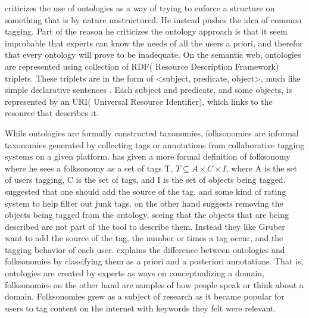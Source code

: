 \citet{Shirky2007} criticizes the use of ontologies as a way of trying to enforce a structure on something that is by nature unstructured. 
He instead pushes the idea of common tagging. 
Part of the reason he criticizes the ontology approach is that it seem improbable that experts can know the needs of all the users a priori, and therefor that every ontology will prove to be inadequate.
On the semantic web, ontologies are represented using collection of RDF( Resource Description Framework) triplets. 
These triplets are in the form of <subject, predicate, object>, much like simple declarative sentences \citep{Berners-Lee2001}. 
Each subject and predicate, and some objects, is represented by an URI( Universal Resource Identifier), which links to the resource that describes it.

While ontologies are formally constructed taxonomies, folksonomies are informal taxonomies generated by collecting tags or annotations from collaborative tagging systems on a given platform\citep{Tang2009}. 
\citet{Mika2005} has given a more formal definition of folksonomy where he sees a folksonomy as a set of tags T, 
$T \subseteq A \times C \times I$, where A is the set of users tagging, C is the set of tags, and I is the set of objects being tagged.
\citet{Gruber2007} suggested that one should add the source of the tag, and some kind of rating system to help filter out junk tags. 
\citet{Scerri2008} on the other hand suggests removing the objects being tagged from the ontology, 
seeing that the objects that are being described are not part of the tool to describe them.
Instead they like Gruber want to add the source of the tag, the number or times a tag occur, and the tagging behavior of each user.
\citet{Bang2008} explains the difference between ontologies and folksonomies by classifying them as a priori and a posteriori annotations. 
That is, ontologies are created by experts as ways on conceptualizing a domain, folksonomies on the other hand are samples of how people speak or think about a domain.
Folksonomies grew as a subject of research as it became popular for users to tag content on the internet with keywords they felt were relevant.

